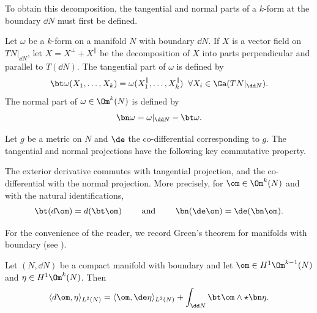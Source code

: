 \documentclass[hidelinks, 12pt, oneside, reqno]{amsart}
\begin{document}
To obtain this decomposition, the tangential and normal parts of a $k$-form at the boundary $\dd N$ must first be defined.

\begin{defn}\label{definition tangential and normal components}
    Let $\omega$ be a $k$-form on a manifold $N$ with boundary $\dd N$. If $X$ is a vector field on $TN|_{\dd N}$, let $X = X^\perp + X^\parallel$ be the decomposition of $X$ into parts perpendicular and parallel to $T(\dd N)$. The tangential part of $\omega$ is defined by
    \[
    \bt \omega (X_1, \ldots, X_k) = \omega(X_1^\parallel, \ldots, X_k^\parallel) \;\;\forall X_i \in \Ga(TN|_{\dd N}).
    \]
    The normal part of $\omega \in \Om^k(N)$ is defined by
    \[
    \bn \omega = \omega|_{\dd N} - \bt \omega.
    \]
\end{defn}
Let $g$ be a metric on $N$ and $\de$ the co-differential corresponding to $g$. The tangential and normal projections have the following key commutative property.
\begin{prop}\cite[Proposition 1.2.6]{HodgeDecompSchwarz}
The exterior derivative commutes with tangential projection, and the co-differential with the normal projection. More precisely, for $\om \in \Om^k(N)$ and with the natural identifications,
\begin{equation}\label{equation commutativity of tangential with ext}
\bt(d\om) = d(\bt \om) \qquad \text{ and } \qquad \bn(\de \om) = \de (\bn \om).
\end{equation}
\end{prop}

For the convenience of the reader, we record Green's theorem for manifolds with boundary (see \cite[Proposition 2.1.2]{HodgeDecompSchwarz}). 
\begin{prop}\label{proposition greens theorem}
Let $(N,\dd N)$ be a compact manifold with boundary and let $\om \in H^1\Om^{k-1}(N)$ and $\eta \in H^1\Om^{k}(N)$. Then
\[
\langle d \om, \eta \rangle_{L^2(N)} = \langle \om, \de \eta \rangle_{L^2(N)} + \int_{\dd N} \bt \om \wedge \star \bn \eta.
\]
\end{prop}
\end{document}

